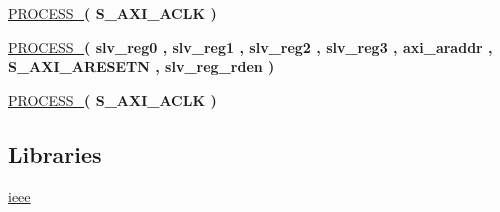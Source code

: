 \begin{DoxyCompactItemize}
\item 
\hypertarget{group__my_g_p_i_o_ga7390c9b34974c278e7646b784061d076}{\hyperlink{group__my_g_p_i_o_ga7390c9b34974c278e7646b784061d076}{P\+R\+O\+C\+E\+S\+S\+\_}{\bfseries  ( {\bfseries \textcolor{vhdlchar}{S\+\_\+\+A\+X\+I\+\_\+\+A\+C\+L\+K}\textcolor{vhdlchar}{ }} )}}\label{group__my_g_p_i_o_ga7390c9b34974c278e7646b784061d076}

\item 
\hypertarget{group__my_g_p_i_o_ga0d489027017d48afa10772d3c37da361}{\hyperlink{group__my_g_p_i_o_ga0d489027017d48afa10772d3c37da361}{P\+R\+O\+C\+E\+S\+S\+\_}{\bfseries  ( {\bfseries \textcolor{vhdlchar}{slv\+\_\+reg0}\textcolor{vhdlchar}{ }} , {\bfseries \textcolor{vhdlchar}{slv\+\_\+reg1}\textcolor{vhdlchar}{ }} , {\bfseries \textcolor{vhdlchar}{slv\+\_\+reg2}\textcolor{vhdlchar}{ }} , {\bfseries \textcolor{vhdlchar}{slv\+\_\+reg3}\textcolor{vhdlchar}{ }} , {\bfseries \textcolor{vhdlchar}{axi\+\_\+araddr}\textcolor{vhdlchar}{ }} , {\bfseries \textcolor{vhdlchar}{S\+\_\+\+A\+X\+I\+\_\+\+A\+R\+E\+S\+E\+T\+N}\textcolor{vhdlchar}{ }} , {\bfseries \textcolor{vhdlchar}{slv\+\_\+reg\+\_\+rden}\textcolor{vhdlchar}{ }} )}}\label{group__my_g_p_i_o_ga0d489027017d48afa10772d3c37da361}

\item 
\hypertarget{group__my_g_p_i_o_ga45eef1701e94703c5a3cf169c02e5e2c}{\hyperlink{group__my_g_p_i_o_ga45eef1701e94703c5a3cf169c02e5e2c}{P\+R\+O\+C\+E\+S\+S\+\_}{\bfseries  ( {\bfseries \textcolor{vhdlchar}{S\+\_\+\+A\+X\+I\+\_\+\+A\+C\+L\+K}\textcolor{vhdlchar}{ }} )}}\label{group__my_g_p_i_o_ga45eef1701e94703c5a3cf169c02e5e2c}

\end{DoxyCompactItemize}
\subsection*{Libraries}
 \begin{DoxyCompactItemize}
\item 
\hypertarget{group__my_g_p_i_o_ga0a6af6eef40212dbaf130d57ce711256}{\hyperlink{group__my_g_p_i_o_ga0a6af6eef40212dbaf130d57ce711256}{ieee} }\label{group__my_g_p_i_o_ga0a6af6eef40212dbaf130d57ce711256}

\end{DoxyCompactItemize}
